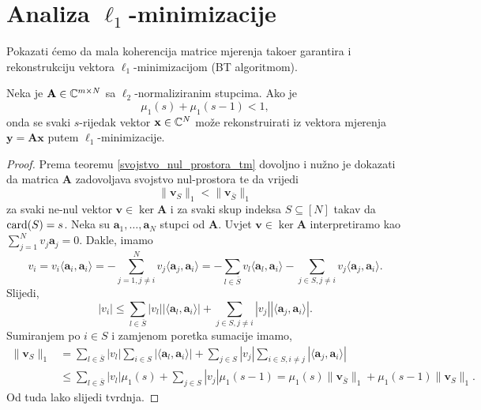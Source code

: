 \documentclass[a4paper,twoside,12pt]{memoir} %
\newcommand{\vect}[1]{\mathbf{#1}}
\renewcommand{\vec}{\vect}
\newcommand{\card}{\text{\normalfont{card}}}
\newcommand{\norm}[1]{\|{#1}\|}
\begin{document}
\section[Analiza $\ell_1$-minimizacije][Analiza $\ell_1$-minimizacije]{Analiza $\ell_1$-minimizacije}
Pokazati \'cemo da mala koherencija matrice mjerenja tako\dj er garantira i rekonstrukciju vektora $\ell_1$-minimizacijom (BT algoritmom).
\begin{thm}\label{tm:5:15}
    Neka je $\vec A \in \C^{m \times N}$ sa $\ell_2$-normaliziranim stupcima. Ako je 
    \begin{equation}\label{5:13}
        \mu_1(s) + \mu_1(s-1) < 1, 
    \end{equation}
    onda se svaki $s$-rijedak vektor $\vec x \in \C^N$ mo\v{z}e rekonstruirati iz vektora mjerenja $\vec y = \vec{Ax}$ putem $\ell_1$-minimizacije.
\end{thm}
\begin{proof}
    Prema teoremu \ref{svojstvo_nul_prostora_tm} dovoljno i nu\v{z}no je dokazati da matrica $\vec A$ zadovoljava svojstvo nul-prostora te da vrijedi
    \begin{equation}\label{5:14}
        \norm{\vec v_S}_1 < \norm{\vec v_{\bar S}}_1 
    \end{equation}
    za svaki ne-nul vektor $\vec v \in \ker \vec A$ i za svaki skup indeksa $S \subseteq [N]$ takav da $\card(S) = s$. Neka su $\vec a_1, \dots, \vec a_N$ stupci od $\vec A$. Uvjet $\vec v \in \ker \vec A$ interpretiramo kao $\sum_{j=1}^N v_j \vec a_j = 0$. Dakle, imamo
    \begin{equation*}
        v_i = v_i \langle \vec a_i, \vec a_i \rangle = - \sum_{j=1,j \neq i}^N v_j \langle \vec a_j, \vec a_i \rangle = - \sum_{l \in \bar S}v_l \langle \vec a_l, \vec a_i \rangle - \sum_{j \in S,j \neq i} v_j \langle \vec a_j, \vec a_i \rangle.
    \end{equation*}
    Slijedi,
    \begin{equation*}
        |v_i| \leq \sum_{l \in \bar S}|v_l||\langle \vec a_l, \vec a_i\rangle| + \sum_{j \in S, j \neq i} |v_j||\langle \vec a_j, \vec a_i \rangle|.
    \end{equation*}
    Sumiranjem po $i \in S$ i zamjenom poretka sumacije imamo,
    \begin{align*}
        \norm{\vec v_S}_1 &= \sum_{l \in \bar S}|v_l|\sum_{i \in S} |\langle \vec a_l, \vec a_i \rangle| + \sum_{j \in S}|v_j| \sum_{i \in S,i \neq j}|\langle \vec a_j, \vec a_i \rangle| \\
        &\leq \sum_{l \in \bar S} |v_l| \mu_1(s) + \sum_{j \in S}|v_j| \mu_1(s-1) = \mu_1(s) \norm{\vec v_{\bar S}}_1 + \mu_1(s-1) \norm{\vec v_S}_1.
    \end{align*}
    Od tuda lako slijedi tvrdnja.
\end{proof}
\end{document}
